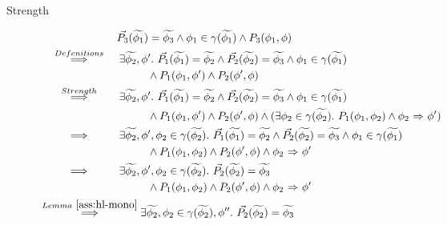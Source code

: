 \begin{proofatend}
\begin{description}
        \item[Strength]
        \begin{align*}
        & \phantom{\overset{}{~\quad\quad\implies\quad\quad~}}~
        \dgrad{P_3}(\grad{\phi_1}) = \grad{\phi_3} \wedge \phi_1 \in \gamma(\grad{\phi_1}) \wedge P_3(\phi_1, \phi)\\
        & \overset{Defenitions}{~\quad\quad\implies\quad\quad~} 
        \exists \grad{\phi_2}, \phi'.~ 
        \dgrad{P_1}(\grad{\phi_1}) = \grad{\phi_2} \wedge \dgrad{P_2}(\grad{\phi_2}) = \grad{\phi_3} \wedge 
        \phi_1 \in \gamma(\grad{\phi_1}) \\
        & \quad\quad\quad\quad\quad\quad\quad\quad\quad\quad
        \wedge P_1(\phi_1, \phi') \wedge P_2(\phi', \phi)\\
        & \overset{Strength}{~\quad\quad\implies\quad\quad~} 
        \exists \grad{\phi_2}, \phi'.~ 
        \dgrad{P_1}(\grad{\phi_1}) = \grad{\phi_2} \wedge \dgrad{P_2}(\grad{\phi_2}) = \grad{\phi_3} \wedge 
        \phi_1 \in \gamma(\grad{\phi_1}) \\
        & \quad\quad\quad\quad\quad\quad\quad\quad\quad\quad
        \wedge P_1(\phi_1, \phi') \wedge P_2(\phi', \phi)
        \wedge (\exists \phi_2 \in \gamma(\grad{\phi_2}).~ P_1(\phi_1, \phi_2) \wedge \phiImplies{\phi_2}{\phi'}) \\
        & \overset{}{~\quad\quad\implies\quad\quad~} 
        \exists \grad{\phi_2}, \phi', \phi_2 \in \gamma(\grad{\phi_2}).~ 
        \dgrad{P_1}(\grad{\phi_1}) = \grad{\phi_2} \wedge \dgrad{P_2}(\grad{\phi_2}) = \grad{\phi_3} \wedge 
        \phi_1 \in \gamma(\grad{\phi_1}) \\
        & \quad\quad\quad\quad\quad\quad\quad\quad\quad\quad
        \wedge P_1(\phi_1, \phi_2) \wedge P_2(\phi', \phi)
        \wedge \phiImplies{\phi_2}{\phi'} \\
        & \overset{}{~\quad\quad\implies\quad\quad~} 
        \exists \grad{\phi_2}, \phi', \phi_2 \in \gamma(\grad{\phi_2}).~ 
        \dgrad{P_2}(\grad{\phi_2}) = \grad{\phi_3}  \\
        & \quad\quad\quad\quad\quad\quad\quad\quad\quad\quad
        \wedge P_1(\phi_1, \phi_2) \wedge P_2(\phi', \phi)
        \wedge \phiImplies{\phi_2}{\phi'} \\
        & \overset{Lemma~\ref{ass:hl-mono}}{~\quad\quad\implies\quad\quad~} 
        \exists \grad{\phi_2}, \phi_2 \in \gamma(\grad{\phi_2}), \phi''.~ 
        \dgrad{P_2}(\grad{\phi_2}) = \grad{\phi_3}   \\
        & \quad\quad\quad\quad\quad\quad\quad\quad\quad\quad

\end{align*}
\end{description}
\end{proofatend}
